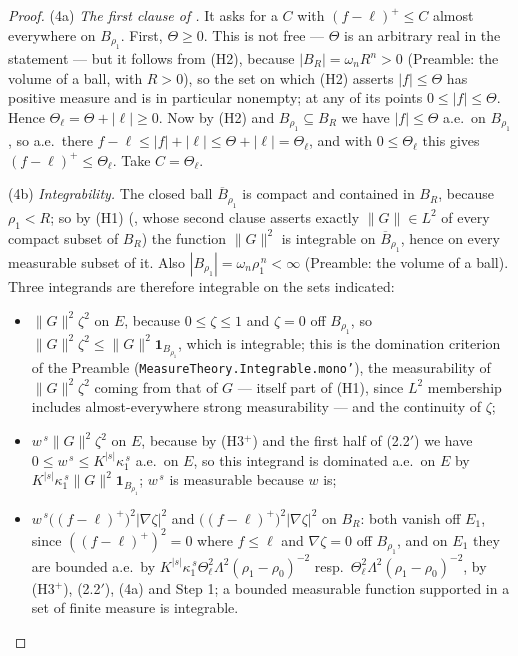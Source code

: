\begin{proof}
\textup{(4a)} \emph{The first clause of .}  It asks
for a $C$ with $(f-\ell)^+\le C$ almost everywhere on $B_{\rho_1}$.  First,
$\Theta\ge0$.  This is not free --- $\Theta$ is an arbitrary real in the
statement --- but it follows from (H2), because $|B_R|=\omega_nR^n>0$ (Preamble:
the volume of a ball, with $R>0$), so the set on which (H2) asserts
$|f|\le\Theta$ has positive measure and is in particular nonempty; at any of its
points $0\le|f|\le\Theta$.  Hence $\Theta_\ell=\Theta+|\ell|\ge0$.  Now by (H2)
and $B_{\rho_1}\subseteq B_R$ we have $|f|\le\Theta$ a.e.\ on $B_{\rho_1}$, so
a.e.\ there $f-\ell\le|f|+|\ell|\le\Theta+|\ell|=\Theta_\ell$, and with
$0\le\Theta_\ell$ this gives $(f-\ell)^+\le\Theta_\ell$.  Take
$C=\Theta_\ell$.

\textup{(4b)} \emph{Integrability.}  The closed ball $\overline B_{\rho_1}$ is
compact and contained in $B_R$, because $\rho_1<R$; so by (H1)
(, whose second clause asserts exactly
$\|G\|\in L^2$ of every compact subset of $B_R$) the function $\|G\|^2$ is
integrable on $\overline B_{\rho_1}$, hence on every measurable subset of it.
Also $|B_{\rho_1}|=\omega_n\rho_1^{\,n}<\infty$ (Preamble: the volume of a
ball).  Three integrands are therefore integrable on the sets indicated:
\begin{itemize}
\item $\|G\|^2\zeta^2$ on $E$, because $0\le\zeta\le1$ and $\zeta=0$ off
  $B_{\rho_1}$, so $\|G\|^2\zeta^2\le\|G\|^2\mathbf1_{B_{\rho_1}}$, which is
  integrable; this is the domination criterion of the Preamble
  (\texttt{MeasureTheory.Integrable.mono'}), the measurability of
  $\|G\|^2\zeta^2$ coming from that of $G$ --- itself part of (H1), since
  $L^2$ membership includes almost-everywhere strong measurability --- and the
  continuity of $\zeta$;
\item $w^{\,s}\|G\|^2\zeta^2$ on $E$, because by (H3$^+$) and the first half of
  (2.2$'$) we have $0\le w^{\,s}\le K^{|s|}\kappa_1^{\,s}$ a.e.\ on $E$, so this
  integrand is dominated a.e.\ on $E$ by
  $K^{|s|}\kappa_1^{\,s}\|G\|^2\mathbf1_{B_{\rho_1}}$; $w^{\,s}$ is measurable
  because $w$ is;
\item $w^{\,s}\bigl((f-\ell)^+\bigr)^2|\nabla\zeta|^2$ and
  $\bigl((f-\ell)^+\bigr)^2|\nabla\zeta|^2$ on $B_R$: both vanish off
  $E_1$, since $((f-\ell)^+)^2=0$ where $f\le\ell$ and $\nabla\zeta=0$ off
  $B_{\rho_1}$, and on $E_1$ they are bounded a.e.\ by
  $K^{|s|}\kappa_1^{\,s}\Theta_\ell^2\Lambda^2(\rho_1-\rho_0)^{-2}$ resp.\
  $\Theta_\ell^2\Lambda^2(\rho_1-\rho_0)^{-2}$, by (H3$^+$), (2.2$'$), (4a) and
  Step 1; a bounded measurable function supported in a set of finite measure is
  integrable.
\end{itemize}


\end{proof}
